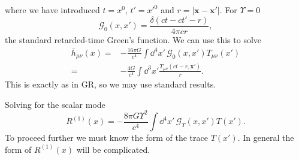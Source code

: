 where we have introduced $t = x^0$, $t' = x'^0$ and $r = |\boldsymbol{x} - \boldsymbol{x'}|$. For $\Upsilon = 0$
\begin{equation}
\mathscr{G}_0(x, x') = \frac{\delta(ct - ct' - r)}{4 \pi c r},
\end{equation}
the standard retarded-time Green's function. We can use this to solve 
\begin{align}
\overline{h}_{\mu\nu}(x) = {} & -\frac{16 \pi G}{c^4}\int \dd^4 x'\, \mathscr{G}_0(x, x') T_{\mu\nu}(x') \nonumber \\
 = {} & -\frac{4 G}{c^4}\int \dd^3 x' \frac{T_{\mu\nu}(ct - r, \boldsymbol{x'})}{r}.
\end{align}
This is exactly as in GR, so we may use standard results.

Solving for the scalar mode
\begin{equation}
R^{(1)}(x) = -\frac{8 \pi G \Upsilon^2}{c^4}\int \dd^4 x'\, \mathscr{G}_\Upsilon(x, x') T(x').
\end{equation}
To proceed further we must know the form of the trace $T(x')$. In general the form of $R^{(1)}(x)$ will be complicated.


